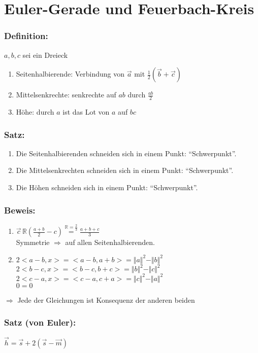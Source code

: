\section{Euler-Gerade und Feuerbach-Kreis}
%
%
%
\subsubsection{Definition:}
$a,b,c$ sei ein Dreieck
\begin{enumerate}
	\item Seitenhalbierende: Verbindung von $\vec{a}$ mit $\frac{1}{2}(\vec{b}+\vec{c})$
	\item Mittelsenkrechte: senkrechte auf $ab$ durch $\frac{ab}{2}$
	\item Höhe: durch $a$ ist das Lot von $a$ auf $bc$
\end{enumerate}
%
%
%
\subsubsection{Satz:}
\begin{enumerate}
	\item Die Seitenhalbierenden schneiden sich in einem Punkt: "`Schwerpunkt"'.
	\item Die Mittelsenkrechten schneiden sich in einem Punkt: "`Schwerpunkt"'.
	\item Die Höhen schneiden sich in einem Punkt: "`Schwerpunkt"'.
\end{enumerate}
%
%
%
\subsubsection{Beweis:}
\begin{enumerate}
	\item $\vec{c}\,\mathbb{R}(\frac{a+b}{2}-c)\mathop{=}\limits^{\mathbb{R}=\frac{2}
	{3}}\frac{a+b+c}{3}$\\
	Symmetrie $\Rightarrow$ auf allen Seitenhalbierenden.
	\item $2<a-b,x>=<a-b,a+b>=\Vert a\Vert^{2}-\Vert b\Vert^{2}$\\
	$2<b-c,x>=<b-c,b+c>=\Vert b \Vert^{2}-\Vert c \Vert^{2}$\\
	$2<c-a,x>=<c-a,c+a>=\Vert c \Vert^{2}-\Vert a\Vert^{2}$\\
	$0=0$
\end{enumerate}
$\Rightarrow$ Jede der Gleichungen ist Konsequenz der anderen beiden
%
%
%
\subsubsection{Satz (von Euler):}
$\vec{h}=\vec{s}+2(\vec{s}-\vec{m})$
%
%
%
